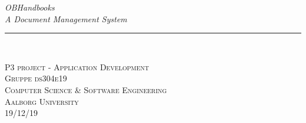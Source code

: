 


\thispagestyle{empty}
\begin{flushright}

\vspace{3cm}

\phantom{hul}

\phantom{hul}

\phantom{hul}

\textsl{\Huge  OBHandbooks} \\ \vspace{1cm}
\textsl{\Large A Document Management System}

\rule{13cm}{3mm} \\ \vspace{1.5cm}
\vspace{1cm}

\vspace{2cm}
\textsc{\Large P3 project - Application Development\\
Gruppe ds304e19 \\
Computer Science \& Software Engineering\\
Aalborg University\\
19/12/19\\}
\end{flushright}
